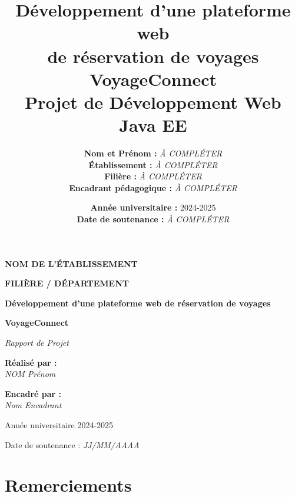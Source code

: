 \documentclass[12pt,a4paper]{report}
\title{
    \Huge \textbf{Développement d'une plateforme web\\de réservation de voyages}\\
    \vspace{1cm}
    \LARGE VoyageConnect\\
    \vspace{0.5cm}
    \large Projet de Développement Web Java EE
}
\author{
    \textbf{Nom et Prénom :} \textit{À COMPLÉTER}\\
    \vspace{0.3cm}
    \textbf{Établissement :} \textit{À COMPLÉTER}\\
    \textbf{Filière :} \textit{À COMPLÉTER}\\
    \vspace{0.3cm}
    \textbf{Encadrant pédagogique :} \textit{À COMPLÉTER}
}
\date{\textbf{Année universitaire :} 2024-2025\\
      \textbf{Date de soutenance :} \textit{À COMPLÉTER}}
\begin{document}
\begin{titlepage}
    \centering
    \vspace*{1cm}
    
    {\scshape\LARGE \textbf{NOM DE L'ÉTABLISSEMENT} \par}
    \vspace{0.5cm}
    {\scshape\Large \textbf{FILIÈRE / DÉPARTEMENT} \par}
    \vspace{2cm}
    
    {\huge\bfseries Développement d'une plateforme web de réservation de voyages\par}
    \vspace{0.5cm}
    {\LARGE\bfseries VoyageConnect\par}
    \vspace{2cm}
    
    {\Large\itshape Rapport de Projet\par}
    \vspace{1cm}
    
    \begin{minipage}{0.4\textwidth}
        \begin{flushleft} \large
            \textbf{Réalisé par :}\\
            \textit{NOM Prénom}\\
        \end{flushleft}
    \end{minipage}
    \hfill
    \begin{minipage}{0.4\textwidth}
        \begin{flushright} \large
            \textbf{Encadré par :}\\
            \textit{Nom Encadrant}\\
        \end{flushright}
    \end{minipage}
    
    \vfill
    
    {\large Année universitaire 2024-2025\par}
    {\large Date de soutenance : \textit{JJ/MM/AAAA}\par}
    
\end{titlepage}

\chapter*{Remerciements}
\end{document}
